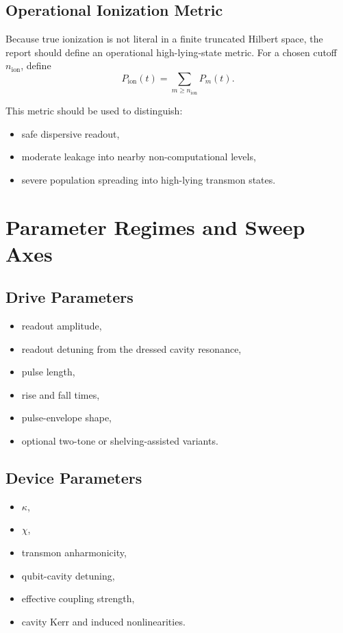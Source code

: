 \documentclass[11pt]{article}
\begin{document}
\subsection{Operational Ionization Metric}

Because true ionization is not literal in a finite truncated Hilbert space, the report
should define an operational high-lying-state metric. For a chosen cutoff
$n_{\mathrm{ion}}$, define
\begin{equation}
    P_{\mathrm{ion}}(t)=\sum_{m\ge n_{\mathrm{ion}}} P_m(t).
\end{equation}

This metric should be used to distinguish:
\begin{itemize}[leftmargin=2em]
    \item safe dispersive readout,
    \item moderate leakage into nearby non-computational levels,
    \item severe population spreading into high-lying transmon states.
\end{itemize}

\section{Parameter Regimes and Sweep Axes}

\subsection{Drive Parameters}
\begin{itemize}[leftmargin=2em]
    \item readout amplitude,
    \item readout detuning from the dressed cavity resonance,
    \item pulse length,
    \item rise and fall times,
    \item pulse-envelope shape,
    \item optional two-tone or shelving-assisted variants.
\end{itemize}

\subsection{Device Parameters}
\begin{itemize}[leftmargin=2em]
    \item $\kappa$,
    \item $\chi$,
    \item transmon anharmonicity,
    \item qubit-cavity detuning,
    \item effective coupling strength,
    \item cavity Kerr and induced nonlinearities.
\end{itemize}
\end{document}
